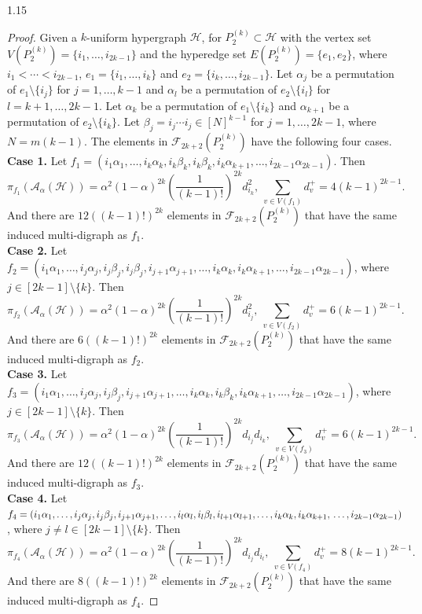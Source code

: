 \documentclass[preprint,12pt]{elsarticle1}
\numberwithin{equation}{section}
\begin{document}
\begin{spacing}{1.15}
\begin{proof}
Given a $k$-uniform hypergraph $\mathcal{H}$, for $P_{2}^{(k)}\subset \mathcal{H}$ with the vertex set $V(P_{2}^{(k)})=\{i_1,\ldots,i_{2k-1}\}$ and the hyperedge set $E(P_2^{(k)})=\{ e_1, e_2 \}$, where $i_1<\cdots<i_{2k-1}$, $e_1=\{i_1,\ldots,i_k\}$ and $e_2=\{i_k,\ldots,i_{2k-1}\}$.
Let $\alpha_j$ be a permutation of $e_1 \setminus\{i_j\}$ for $j=1,\ldots,k-1$ and $\alpha_l$ be a permutation of $e_2 \setminus\{i_l\}$ for $l=k+1,\ldots,2k-1$.
Let $\alpha_k$ be a permutation of $e_1 \setminus\{i_k\}$ and $\alpha_{k+1}$ be a permutation of $e_2 \setminus\{i_k\}$.
Let $\beta_j=i_j\cdots i_j\in[N]^{k-1}$ for $j=1,\ldots,2k-1$, where $N=m(k-1)$.
The elements in $\mathcal{F}_{2k+2}(P_{2}^{(k)})$ have the following four cases.\\
\textbf{Case 1.} Let $f_1=(i_1\alpha_1,\ldots,i_k\alpha_k,i_k\beta_k,i_k\beta_k,i_k\alpha_{k+1},\ldots,i_{2k-1}\alpha_{2k-1})$.
Then $$\pi_{f_1}(\mathcal{A}_{\alpha}(\mathcal{H}))=\alpha^2(1-\alpha)^{2k}\left( \frac{1}{(k-1)!} \right)^{2k}d_{i_k}^{2},~ \sum_{v\in V(f_1)}d_v^{+}=4(k-1)^{2k-1}.$$
And there are $12((k-1)!)^{2k}$ elements in $\mathcal{F}_{2k+2}(P_{2}^{(k)})$ that have the same induced multi-digraph as $f_1$.\\
\textbf{Case 2.} Let $f_2=(i_1\alpha_1,\ldots,i_j\alpha_j,i_j\beta_j,i_j\beta_j,i_{j+1}\alpha_{j+1},\ldots,i_k\alpha_k,i_k\alpha_{k+1},\ldots,i_{2k-1}\alpha_{2k-1})$, where $j\in[2k-1]\setminus\{k\}$. Then $$\pi_{f_2}(\mathcal{A}_{\alpha}(\mathcal{H}))=\alpha^2(1-\alpha)^{2k}\left( \frac{1}{(k-1)!} \right)^{2k}d_{i_j}^{2},~ \sum_{v\in V(f_2)}d_v^{+}=6(k-1)^{2k-1}.$$
And there are $6((k-1)!)^{2k}$ elements in $\mathcal{F}_{2k+2}(P_{2}^{(k)})$ that have the same induced multi-digraph as $f_2$.\\
\textbf{Case 3.} Let $f_3=(i_1\alpha_1,\ldots,i_j\alpha_j,i_j\beta_j,i_{j+1}\alpha_{j+1},\ldots,i_k\alpha_k,i_k\beta_k,i_k\alpha_{k+1},\ldots,i_{2k-1}\alpha_{2k-1})$, where $j\in[2k-1]\setminus\{k\}$. Then $$\pi_{f_3}(\mathcal{A}_{\alpha}(\mathcal{H}))=\alpha^2(1-\alpha)^{2k}\left( \frac{1}{(k-1)!} \right)^{2k}d_{i_j}d_{i_k},~ \sum_{v\in V(f_3)}d_v^{+}=6(k-1)^{2k-1}.$$
And there are $12((k-1)!)^{2k}$ elements in $\mathcal{F}_{2k+2}(P_{2}^{(k)})$ that have the same induced multi-digraph as $f_3$.\\
\textbf{Case 4.} Let $f_4=(i_1\alpha_1,\ldots,i_j\alpha_j,i_j\beta_j,i_{j+1}\alpha_{j+1},\ldots,i_l\alpha_l,i_l\beta_l,i_{l+1}\alpha_{l+1},\ldots,i_k\alpha_k, i_k\alpha_{k+1},\\ \ldots,i_{2k-1}\alpha_{2k-1})$, where $j\ne l\in[2k-1]\setminus\{k\}$. Then $$\pi_{f_4}(\mathcal{A}_{\alpha}(\mathcal{H}))=\alpha^2(1-\alpha)^{2k}\left( \frac{1}{(k-1)!} \right)^{2k}d_{i_j}d_{i_l},~ \sum_{v\in V(f_4)}d_v^{+}=8(k-1)^{2k-1}.$$
And there are $8((k-1)!)^{2k}$ elements in $\mathcal{F}_{2k+2}(P_{2}^{(k)})$ that have the same induced multi-digraph as $f_4$.


\end{proof}
\end{spacing}
\end{document}
